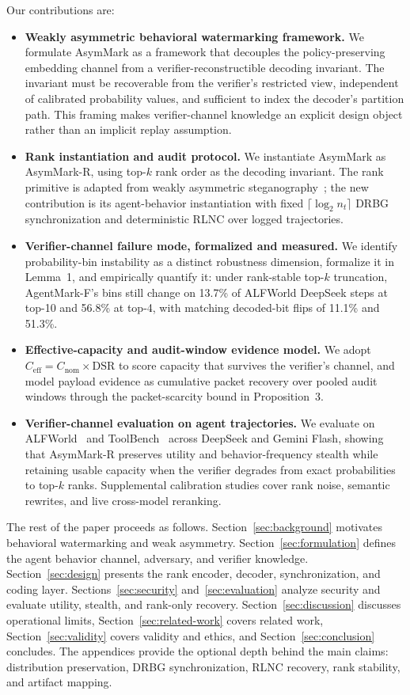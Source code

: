 \documentclass[conference,compsoc]{IEEEtran}
\newcommand{\framework}{AsymMark}
\newcommand{\ours}{AsymMark-R}
\newcommand{\agentmark}{AgentMark-F}
\newcommand{\Ceff}{\ensuremath{C_{\mathrm{eff}}}}
\begin{document}
Our contributions are:
\begin{itemize}[leftmargin=*]
  \item \textbf{Weakly asymmetric behavioral watermarking framework.} We formulate \framework{} as a framework that decouples the policy-preserving embedding channel from a verifier-reconstructible decoding invariant. The invariant must be recoverable from the verifier's restricted view, independent of calibrated probability values, and sufficient to index the decoder's partition path. This framing makes verifier-channel knowledge an explicit design object rather than an implicit replay assumption.
  \item \textbf{Rank instantiation and audit protocol.} We instantiate \framework{} as \ours{}, using top-$k$ rank order as the decoding invariant. The rank primitive is adapted from weakly asymmetric steganography~\cite{weakasym2026}; the new contribution is its agent-behavior instantiation with fixed $\lceil\log_2 n_t\rceil$ DRBG synchronization and deterministic RLNC over logged trajectories.
  \item \textbf{Verifier-channel failure mode, formalized and measured.} We identify probability-bin instability as a distinct robustness dimension, formalize it in Lemma~1, and empirically quantify it: under rank-stable top-$k$ truncation, \agentmark{}'s bins still change on 13.7\% of ALFWorld DeepSeek steps at top-10 and 56.8\% at top-4, with matching decoded-bit flips of 11.1\% and 51.3\%.
  \item \textbf{Effective-capacity and audit-window evidence model.} We adopt $\Ceff=C_{\mathrm{nom}}\times\mathrm{DSR}$ to score capacity that survives the verifier's channel, and model payload evidence as cumulative packet recovery over pooled audit windows through the packet-scarcity bound in Proposition~3.
  \item \textbf{Verifier-channel evaluation on agent trajectories.} We evaluate on ALFWorld~\cite{shridhar2021alfworld} and ToolBench~\cite{qin2023toolllm} across DeepSeek and Gemini Flash, showing that \ours{} preserves utility and behavior-frequency stealth while retaining usable capacity when the verifier degrades from exact probabilities to top-$k$ ranks. Supplemental calibration studies cover rank noise, semantic rewrites, and live cross-model reranking.
\end{itemize}

The rest of the paper proceeds as follows. Section~\ref{sec:background} motivates behavioral watermarking and weak asymmetry. Section~\ref{sec:formulation} defines the agent behavior channel, adversary, and verifier knowledge. Section~\ref{sec:design} presents the rank encoder, decoder, synchronization, and coding layer. Sections~\ref{sec:security} and~\ref{sec:evaluation} analyze security and evaluate utility, stealth, and rank-only recovery. Section~\ref{sec:discussion} discusses operational limits, Section~\ref{sec:related-work} covers related work, Section~\ref{sec:validity} covers validity and ethics, and Section~\ref{sec:conclusion} concludes. The appendices provide the optional depth behind the main claims: distribution preservation, DRBG synchronization, RLNC recovery, rank stability, and artifact mapping.
\end{document}
